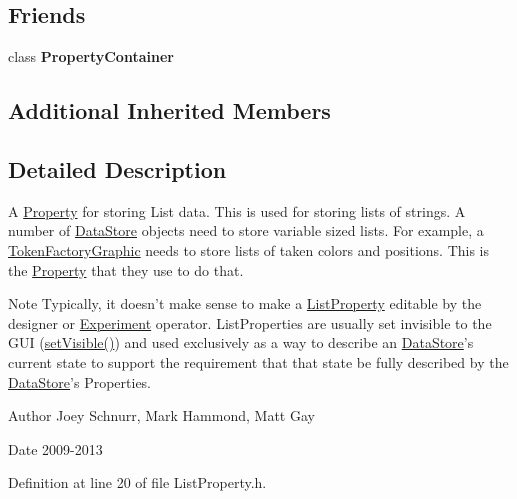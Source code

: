 \subsection*{Friends}
\begin{DoxyCompactItemize}
\item 
\hypertarget{class_picto_1_1_list_property_a7ff968ca40027b2b0500a9260b463e3a}{class {\bfseries Property\-Container}}\label{class_picto_1_1_list_property_a7ff968ca40027b2b0500a9260b463e3a}

\end{DoxyCompactItemize}
\subsection*{Additional Inherited Members}


\subsection{Detailed Description}
A \hyperlink{class_picto_1_1_property}{Property} for storing List data. This is used for storing lists of strings. A number of \hyperlink{class_picto_1_1_data_store}{Data\-Store} objects need to store variable sized lists. For example, a \hyperlink{class_picto_1_1_token_factory_graphic}{Token\-Factory\-Graphic} needs to store lists of taken colors and positions. This is the \hyperlink{class_picto_1_1_property}{Property} that they use to do that. 

\begin{DoxyNote}{Note}
Typically, it doesn't make sense to make a \hyperlink{class_picto_1_1_list_property}{List\-Property} editable by the designer or \hyperlink{class_picto_1_1_experiment}{Experiment} operator. List\-Properties are usually set invisible to the G\-U\-I (\hyperlink{class_picto_1_1_property_ad55eb788c4d635b92fa5944c78a1d346}{set\-Visible()}) and used exclusively as a way to describe an \hyperlink{class_picto_1_1_data_store}{Data\-Store}'s current state to support the requirement that that state be fully described by the \hyperlink{class_picto_1_1_data_store}{Data\-Store}'s Properties. 
\end{DoxyNote}
\begin{DoxyAuthor}{Author}
Joey Schnurr, Mark Hammond, Matt Gay 
\end{DoxyAuthor}
\begin{DoxyDate}{Date}
2009-\/2013 
\end{DoxyDate}


Definition at line 20 of file List\-Property.\-h.



